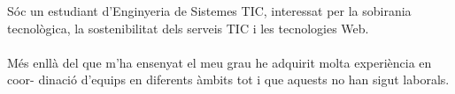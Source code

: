 \documentclass[9pt]{developercv} %
\begin{document}
\vspace{0.5cm}



\begin{minipage}[t]{0.4\textwidth} %
	\vspace{-\baselineskip} %
    Sóc un estudiant d’Enginyeria de Sistemes
	TIC, interessat per la sobirania tecnològica, la
	sostenibilitat dels serveis TIC i les tecnologies
	Web.
    \\
    \\
    Més enllà del que m’ha ensenyat el meu
	grau he adquirit molta experiència en coor-
	dinació d’equips en diferents àmbits tot i que
	aquests no han sigut laborals.
\end{minipage}
\hfill %
\begin{minipage}[t]{0.5\textwidth} %
	\vspace{-\baselineskip} %
	\begin{barchart}{5.5}
	\end{barchart}
\end{minipage}


\end{document}
